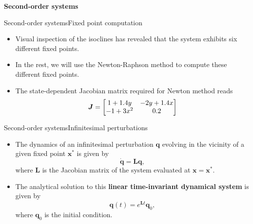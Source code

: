 \documentclass[usenames,dvipsnames,svgnames,10pt,aspectratio=169]{beamer}
\begin{document}
\begin{frame}[t, c]{}
	\centering
	\vspace{1cm}

	{\Large \textbf{Second-order systems}}

	\bigskip

	{}

\end{frame}

\begin{frame}[t, c]{Second-order systems}{Fixed point computation}
	\begin{itemize}
		\item Visual inspection of the isoclines has revealed that the system exhibits six different fixed points.

		\bigskip

		\item In the rest, we will use the Newton-Raphson method to compute these different fixed points.

		\bigskip

		\item The state-dependent Jacobian matrix required for Newton method reads
		\begin{equation}
			{\bm J} = \begin{bmatrix}
									1 + 1.4y & -2 y + 1.4 x \\
									-1 + 3 x^2 & 0.2
								\end{bmatrix}
			\notag
		\end{equation}
	\end{itemize}

	\vspace{1cm}
\end{frame}

\begin{frame}[t, c]{Second-order systems}{Infinitesimal perturbations}
	\begin{itemize}
		\item The dynamics of an infinitesimal perturbation ${\bm q}$ evolving in the vicinity of a given fixed point ${\bm x}^*$ is given by
		$$\dot{\bm q} = {\bm L}{\bm q},$$
		where ${\bm L}$ is the Jacobian matrix of the system evaluated at ${\bm x} = {\bm x}^*$.

		\bigskip

		\item The analytical solution to this \alert{\textbf{linear time-invariant dynamical system}} is given by
		$${\bm q}(t) = e^{{\bm L}t}{\bm q}_0,$$
		where ${\bm q}_0$ is the initial condition.
	\end{itemize}

	\vspace{1cm}
\end{frame}
\end{document}
